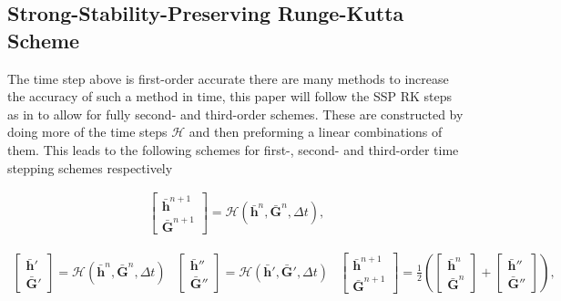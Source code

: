 \documentclass[SingleSpace,12pt]{Serre_ASCE}
\begin{document}
\subsection{Strong-Stability-Preserving Runge-Kutta Scheme} %
The time step above is first-order accurate there are many methods to increase the accuracy of such a method in time, this paper will follow the SSP RK steps as in \cite{Gottlieb-etal-2009-251} to allow for fully second- and third-order schemes. These are constructed by doing more of the time steps $\mathcal{H}$ and then preforming a linear combinations of them. This leads to the following schemes for first-, second- and third-order time stepping schemes respectively
\begin{linenomath*}
\begin{gather}\label{eq:SSPRK1}
\left[\begin{array}{c}
 \boldsymbol{\bar{h}}^{n+1} \\
 \boldsymbol{\bar{G}}^{n+1} \end{array}\right] = \mathcal{H}\left(\boldsymbol{\bar{h}}^{n},\boldsymbol{\bar{G}}^{n},\Delta t\right),
\end{gather}
\end{linenomath*}
%
\begin{linenomath*}
\begin{subequations}
\begin{gather}\label{eq:SSPRK21}
\left[\begin{array}{c}
 \boldsymbol{\bar{h}}' \\
 \boldsymbol{\bar{G}}' \end{array}\right] = \mathcal{H}\left(\boldsymbol{\bar{h}}^{n},\boldsymbol{\bar{G}}^{n},\Delta t\right)
\end{gather}
\begin{gather}\label{eq:SSPRK22}
\left[\begin{array}{c}
 \boldsymbol{\bar{h}}'' \\
 \boldsymbol{\bar{G}}'' \end{array}\right] = \mathcal{H}\left(\boldsymbol{\bar{h}}',\boldsymbol{\bar{G}}',\Delta t\right)
\end{gather}
\begin{gather}\label{eq:SSPRK23}
\left[\begin{array}{c}
 \boldsymbol{\bar{h}}^{n+1} \\
 \boldsymbol{\bar{G}}^{n+1} \end{array}\right] = \frac{1}{2}\left(\left[\begin{array}{c}
  \boldsymbol{\bar{h}}^{n} \\
  \boldsymbol{\bar{G}}^{n} \end{array}\right] + \left[\begin{array}{c}
   \boldsymbol{\bar{h}}'' \\
   \boldsymbol{\bar{G}}'' \end{array}\right] \right),
\end{gather}
\end{subequations}
\label{eq:SSPRK2}
\end{linenomath*}
\end{document}
